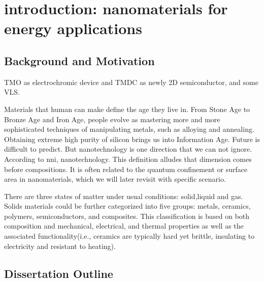 
\chapter{introduction: nanomaterials for energy applications}

\section{Background and Motivation}

TMO as electrochromic device and TMDC as newly 2D semiconductor, and some VLS.

Materials that human can make define the age they live in. From Stone Age to Bronze Age and Iron Age, people evolve as mastering more and more sophisticated techniques of manipulating metals, such as alloying and annealing. Obtaining extreme high purity of silicon brings us into Information Age. Future is difficult to predict. But nanotechnology is one direction that we can not ignore. According to \gls{nni}, \gls{nanotechnology}. This definition alludes that dimension comes before compositions. It is often related to the quantum confinement or surface area in nanomaterials, which we will later revisit with specific scenario.

There are three states of matter under usual conditions: solid,liquid and gas. Solids materials could be further categorized into five groups: metals, ceramics, polymers, semiconductors, and composites.\cite{William2009} This classification is based on both composition and mechanical, electrical, and thermal properties as well as the associated functionality(i.e., \gls{ceramics} are typically hard yet brittle, insulating to electricity and resistant to heating).

\section{Dissertation Outline}

